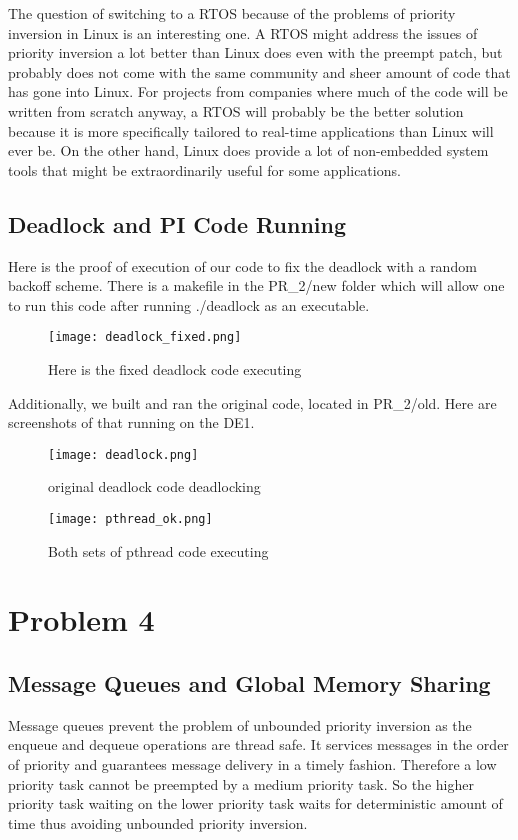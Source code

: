 \documentclass{article}
\begin{document}
The question of switching to a RTOS because of the problems of priority inversion in Linux is an interesting one. A RTOS might address the issues of priority inversion a lot better than Linux does even with the preempt patch, but probably does not come with the same community and sheer amount of code that has gone into Linux. For projects from companies where much of the code will be written from scratch anyway, a RTOS will probably be the better solution because it is more specifically tailored to real-time applications than Linux will ever be. On the other hand, Linux does provide a lot of non-embedded system tools that might be extraordinarily useful for some applications.
\subsection*{Deadlock and PI Code Running}
Here is the proof of execution of our code to fix the deadlock with a random backoff scheme. There is a makefile in the PR\_2/new folder which will allow one to run this code after running ./deadlock as an executable.
\begin{figure}[H]
    \centering
    \texttt{[image: deadlock\_fixed.png]}
    \caption{Here is the fixed deadlock code executing}
\end{figure}

Additionally, we built and ran the original code, located in PR\_2/old. Here are screenshots of that running on the DE1.
\begin{figure}[H]
    \centering
    \texttt{[image: deadlock.png]}
    \caption{original deadlock code deadlocking}
\end{figure}
\begin{figure}[H]
    \centering
    \texttt{[image: pthread\_ok.png]}
    \caption{Both sets of pthread code executing}
\end{figure}    


\section*{Problem 4}
\subsection*{Message Queues and Global Memory Sharing}
Message queues prevent the problem of unbounded priority inversion as the enqueue and dequeue operations are thread safe. It services messages in the order of priority and guarantees message delivery in a timely fashion. Therefore a low priority task cannot be preempted by a medium priority task. So the higher priority task waiting on the lower priority task  waits for deterministic amount of time thus avoiding unbounded priority inversion.
\end{document}
